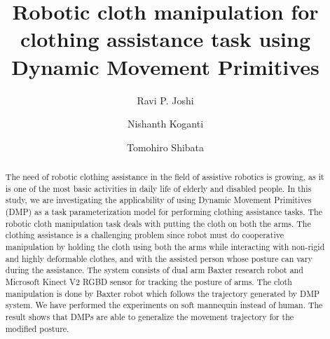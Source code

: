 \documentclass[sigconf]{acmart}
\begin{document}
\title{Robotic cloth manipulation for clothing assistance task using Dynamic Movement
Primitives}


\author{Ravi P. Joshi}

\author{Nishanth Koganti}

\author{Tomohiro Shibata}

\graphicspath{{./images/}}

\begin{abstract}
	The need of robotic clothing assistance in the field of assistive robotics is growing, as it is one of the most basic activities in daily life of elderly and disabled people. In this study, we are investigating the applicability of using Dynamic Movement Primitives (DMP) as a task parameterization model for performing clothing assistance tasks. The robotic cloth manipulation task deals with putting the cloth on both the arms. The clothing assistance is a challenging problem since robot must do cooperative manipulation by holding the cloth using both the arms while interacting with non-rigid and highly deformable clothes, and with the assisted person whose posture can vary during the assistance. The system consists of dual arm Baxter research robot and Microsoft Kinect V2 RGBD sensor for tracking the posture of arms. The cloth manipulation is done by Baxter robot which follows the trajectory generated by DMP system. We have performed the experiments on soft mannequin instead of human. The result shows that DMPs are able to generalize the movement trajectory for the modified posture.
\end{abstract}
\end{document}
